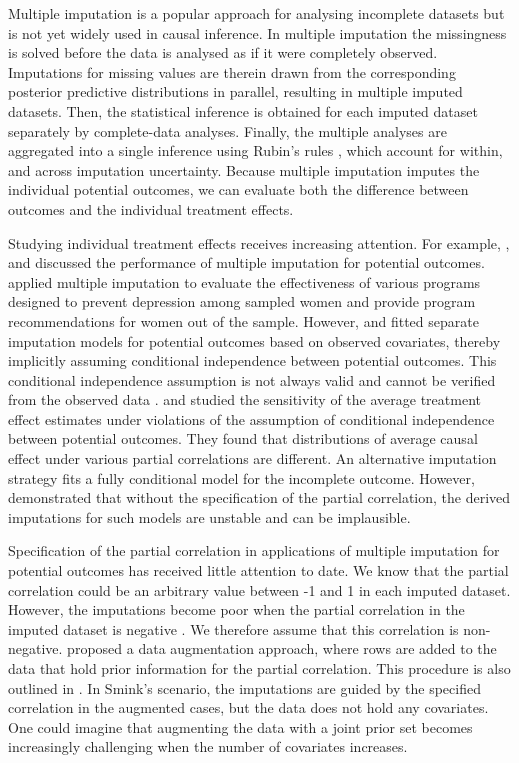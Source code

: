 	Multiple imputation is a popular approach for analysing incomplete datasets but is not yet widely used in causal inference. In multiple imputation the missingness is solved before the data is analysed as if it were completely observed. Imputations for missing values are therein drawn from the corresponding posterior predictive distributions in parallel, resulting in multiple imputed datasets. Then, the statistical inference is obtained for each imputed dataset separately by complete-data analyses. Finally, the multiple analyses are aggregated into a single inference using Rubin's rules \citep[pp. 76]{RubinD1987}, which account for within, and across imputation uncertainty. Because multiple imputation imputes the individual potential outcomes, we can evaluate both the difference between outcomes and the individual treatment effects. 
	
	Studying individual treatment effects receives increasing attention. For example, \citet{lamont2018identification}, and \citet{westreich2015imputation} discussed the performance of multiple imputation for potential outcomes. \citet{lamont2018identification} applied multiple imputation to evaluate the effectiveness of various programs designed to prevent depression among sampled women and provide program recommendations for women out of the sample. However, \citet{lamont2018identification} and \citet{westreich2015imputation} fitted separate imputation models for potential outcomes based on observed covariates, thereby implicitly assuming conditional independence between potential outcomes. This conditional independence assumption is not always valid and cannot be verified from the observed data \citep{rassler2012statistical}. \citet{imbens2015causal} and \citet{gadbury2001evaluating} studied the sensitivity of the average treatment effect estimates under violations of the assumption of conditional independence between potential outcomes. They found that distributions of average causal effect under various partial correlations are different. An alternative imputation strategy fits a fully conditional model for the incomplete outcome. However, \citet{Buuren2018} demonstrated that without the specification of the partial correlation, the derived imputations for such models are unstable and can be implausible. 
	
	Specification of the partial correlation in applications of multiple imputation for potential outcomes has received little attention to date. We know that the partial correlation could be an arbitrary value between -1 and 1 in each imputed dataset. However, the imputations become poor when the partial correlation in the imputed dataset is negative \citep[Section 8.4.1]{Buuren2018}. We therefore assume that this correlation is non-negative. \citet{smink2016towards} proposed a data augmentation approach, where rows are added to the data that hold prior information for the partial correlation. This procedure is also outlined in \citep[Section 8.4.2]{Buuren2018}. In Smink's scenario, the imputations are guided by the specified correlation in the augmented cases, but the data does not hold any covariates. One could imagine that augmenting the data with a joint prior set becomes increasingly challenging when the number of covariates increases. 
	

